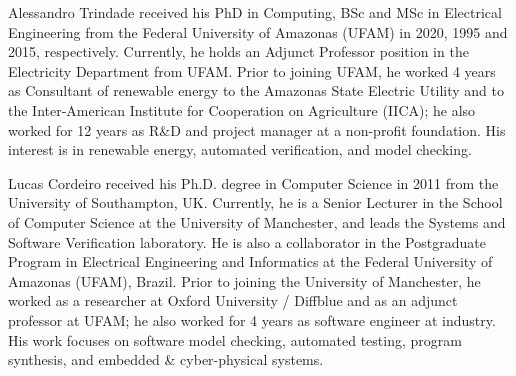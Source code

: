 \documentclass[10pt,journal,compsoc]{IEEEtran}
\begin{document}
\begin{IEEEbiography}
    {Alessandro Trindade}
received his PhD in Computing, BSc and MSc in Electrical Engineering from the Federal University of Amazonas (UFAM) in 2020, 1995 and 2015, respectively. Currently, he holds an Adjunct Professor position in the Electricity Department from UFAM. Prior to joining UFAM, he worked 4 years as Consultant of renewable energy to the Amazonas State Electric Utility and to the Inter-American Institute for Cooperation on Agriculture (IICA); he also worked for 12 years as R\&D and project manager at a non-profit foundation. His interest is in renewable energy, automated verification, and model checking.
\end{IEEEbiography}

\begin{IEEEbiography}
    {Lucas Cordeiro}
received his Ph.D. degree in Computer Science in 2011 from the University of Southampton, UK. Currently, he is a Senior Lecturer in the School of Computer Science at the University of Manchester, and leads the Systems and Software Verification laboratory. He is also a collaborator in the Postgraduate Program in Electrical Engineering and Informatics at the Federal University of Amazonas (UFAM), Brazil. Prior to joining the University of Manchester, he worked as a researcher at Oxford University / Diffblue and as an adjunct professor at UFAM; he also worked for 4 years as software engineer at industry. His work focuses on software model checking, automated testing, program synthesis, and embedded \& cyber-physical systems.
\end{IEEEbiography}
\end{document}
